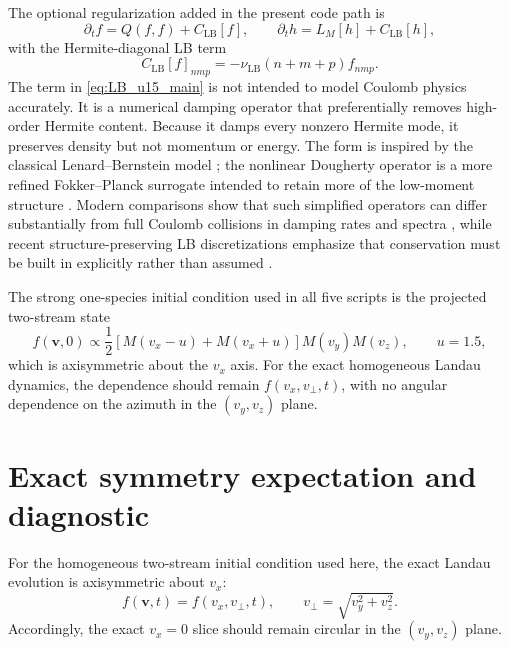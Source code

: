 \documentclass[11pt]{article}
\begin{document}
The optional regularization added in the present code path is
\begin{equation}
\partial_t f = Q(f,f) + C_{\mathrm{LB}}[f],
\qquad
\partial_t h = L_M[h] + C_{\mathrm{LB}}[h],
\label{eq:lb_rhs_u15}
\end{equation}
with the Hermite-diagonal LB term
\begin{equation}
C_{\mathrm{LB}}[f]_{nmp}=-\nu_{\mathrm{LB}}(n+m+p)f_{nmp}.
\label{eq:LB_u15_main}
\end{equation}
The term in \cref{eq:LB_u15_main} is not intended to model Coulomb physics accurately.
It is a numerical damping operator that preferentially removes high-order Hermite content.
Because it damps every nonzero Hermite mode, it preserves density but not momentum or energy.
The form is inspired by the classical Lenard--Bernstein model \cite{lenard1958plasma}; the nonlinear Dougherty operator is a more refined Fokker--Planck surrogate intended to retain more of the low-moment structure \cite{dougherty1964model}.
Modern comparisons show that such simplified operators can differ substantially from full Coulomb collisions in damping rates and spectra \cite{jorge2019collisionality,belli2017advanced}, while recent structure-preserving LB discretizations emphasize that conservation must be built in explicitly rather than assumed \cite{jeyakumar2024lb}.

The strong one-species initial condition used in all five scripts is the projected two-stream state
\begin{equation}
f(\mathbf v,0) \propto \frac{1}{2}\left[M(v_x-u)+M(v_x+u)\right]M(v_y)M(v_z),
\qquad u=1.5,
\label{eq:twostream_u15}
\end{equation}
which is axisymmetric about the $v_x$ axis.
For the exact homogeneous Landau dynamics, the dependence should remain $f(v_x,v_\perp,t)$, with no angular dependence on the azimuth in the $(v_y,v_z)$ plane.

\section{Exact symmetry expectation and diagnostic}
For the homogeneous two-stream initial condition used here, the exact Landau evolution is axisymmetric about $v_x$:
\begin{equation}
f(\mathbf v,t)=f(v_x,v_\perp,t), \qquad v_\perp=\sqrt{v_y^2+v_z^2}.
\end{equation}
Accordingly, the exact $v_x=0$ slice should remain circular in the $(v_y,v_z)$ plane.
\end{document}
